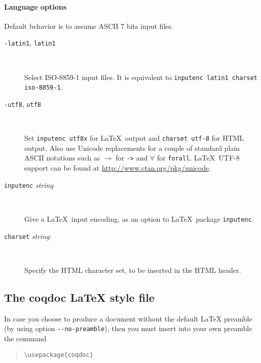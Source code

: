 \paragraph{Language options}

Default behavior is to assume ASCII 7 bits input files.

\begin{description}

\item[\texttt{-latin1}, \texttt{\mm{}latin1}] ~\par

  Select ISO-8859-1 input files. It is equivalent to
  \texttt{\mm{}inputenc latin1 \mm{}charset iso-8859-1}.

\item[\texttt{-utf8}, \texttt{\mm{}utf8}] ~\par

  Set \texttt{\mm{}inputenc utf8x} for \LaTeX\ output and
  \texttt{\mm{}charset utf-8} for HTML output. Also use Unicode
  replacements for a couple of standard plain ASCII notations such
  as $\rightarrow$ for \texttt{->} and $\forall$ for
  \texttt{forall}. \LaTeX\ UTF-8 support can be found at
  \url{http://www.ctan.org/pkg/unicode}.

\item[\texttt{\mm{}inputenc} \textit{string}] ~\par

  Give a \LaTeX\ input encoding, as an option to \LaTeX\ package
  \texttt{inputenc}. 

\item[\texttt{\mm{}charset} \textit{string}] ~\par

  Specify the HTML character set, to be inserted in the HTML header.

\end{description}



\subsection[The coqdoc \LaTeX{} style file]{The coqdoc \LaTeX{} style file\label{section:coqdoc.sty}}

In case you choose to produce a document without the default \LaTeX{}
preamble (by using option \verb|--no-preamble|), then you must insert
into your own preamble the command
\begin{quote}
  \verb|\usepackage{coqdoc}|
\end{quote}

